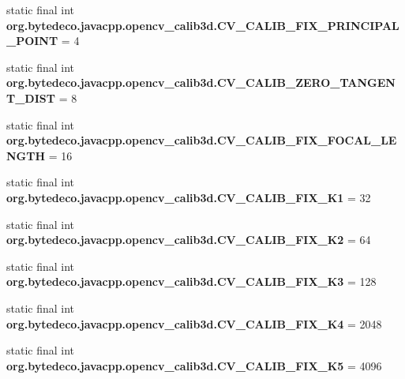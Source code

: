\begin{DoxyCompactItemize}
static final int {\bfseries org.\+bytedeco.\+javacpp.\+opencv\+\_\+calib3d.\+C\+V\+\_\+\+C\+A\+L\+I\+B\+\_\+\+F\+I\+X\+\_\+\+P\+R\+I\+N\+C\+I\+P\+A\+L\+\_\+\+P\+O\+I\+NT} = 4
\item 
\mbox{\label{group__calib3d__c_gabd40af18de80d3b96b5b4bce166ec8d9}} 
static final int {\bfseries org.\+bytedeco.\+javacpp.\+opencv\+\_\+calib3d.\+C\+V\+\_\+\+C\+A\+L\+I\+B\+\_\+\+Z\+E\+R\+O\+\_\+\+T\+A\+N\+G\+E\+N\+T\+\_\+\+D\+I\+ST} = 8
\item 
\mbox{\label{group__calib3d__c_gaa3711857e3b14789473cf02ddf3c17d6}} 
static final int {\bfseries org.\+bytedeco.\+javacpp.\+opencv\+\_\+calib3d.\+C\+V\+\_\+\+C\+A\+L\+I\+B\+\_\+\+F\+I\+X\+\_\+\+F\+O\+C\+A\+L\+\_\+\+L\+E\+N\+G\+TH} = 16
\item 
\mbox{\label{group__calib3d__c_gad1eae5c430e0ae28c20e0eca3bed3030}} 
static final int {\bfseries org.\+bytedeco.\+javacpp.\+opencv\+\_\+calib3d.\+C\+V\+\_\+\+C\+A\+L\+I\+B\+\_\+\+F\+I\+X\+\_\+\+K1} = 32
\item 
\mbox{\label{group__calib3d__c_ga49254dc39c949f0223b7dd37c9d345b9}} 
static final int {\bfseries org.\+bytedeco.\+javacpp.\+opencv\+\_\+calib3d.\+C\+V\+\_\+\+C\+A\+L\+I\+B\+\_\+\+F\+I\+X\+\_\+\+K2} = 64
\item 
\mbox{\label{group__calib3d__c_ga84439d410669abd082e602a97f6f3052}} 
static final int {\bfseries org.\+bytedeco.\+javacpp.\+opencv\+\_\+calib3d.\+C\+V\+\_\+\+C\+A\+L\+I\+B\+\_\+\+F\+I\+X\+\_\+\+K3} = 128
\item 
\mbox{\label{group__calib3d__c_gaa7d681c074d53c6bc15f1db5db6244f1}} 
static final int {\bfseries org.\+bytedeco.\+javacpp.\+opencv\+\_\+calib3d.\+C\+V\+\_\+\+C\+A\+L\+I\+B\+\_\+\+F\+I\+X\+\_\+\+K4} = 2048
\item 
\mbox{\label{group__calib3d__c_gad655cae744443caf37ca18649cea72f0}} 
static final int {\bfseries org.\+bytedeco.\+javacpp.\+opencv\+\_\+calib3d.\+C\+V\+\_\+\+C\+A\+L\+I\+B\+\_\+\+F\+I\+X\+\_\+\+K5} = 4096
\item 
\mbox{\label{group__calib3d__c_ga1c5c20a81aad27514d4081bd8aa2cdab}} 

\end{DoxyCompactItemize}
